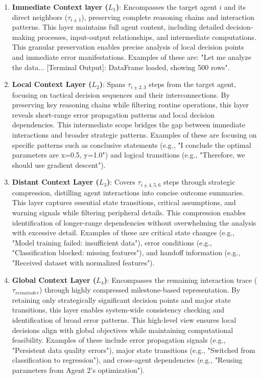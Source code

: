 \documentclass{article}
\begin{document}
\begin{enumerate}
    \item \textbf{Immediate Context layer ($L_1$)}: Encompasses the target agent $i$ and its direct neighbors ($\tau_{i\pm1}$), preserving complete reasoning chains and interaction patterns. This layer maintains full agent content, including detailed decision-making processes, input-output relationships, and intermediate computations. This granular preservation enables precise analysis of local decision points and immediate error manifestations. Examples of these are: "Let me analyze the data... [Terminal Output]: DataFrame loaded, showing 500 rows". 
    \item \textbf{Local Context Layer ($L_2$)}: Spans $\tau_{i\pm2,3}$ steps from the target agent, focusing on tactical decision sequences and their interconnections. By preserving key reasoning chains while filtering routine operations, this layer reveals short-range error propagation patterns and local decision dependencies. This intermediate scope bridges the gap between immediate interactions and broader strategic patterns. Examples of these are focusing on specific patterns such as conclusive statements (e.g., "I conclude the optimal parameters are x=0.5, y=1.0") and logical transitions (e.g., "Therefore, we should use gradient descent"). 
    \item \textbf{Distant Context Layer ($L_3$)}: Covers $\tau_{i\pm4,5,6}$ steps through strategic compression, distilling agent interactions into concise outcome summaries. This layer captures essential state transitions, critical assumptions, and warning signals while filtering peripheral details. This compression enables identification of longer-range dependencies without overwhelming the analysis with excessive detail. Examples of these are critical state changes (e.g., "Model training failed: insufficient data"), error conditions (e.g., "Classification blocked: missing features"), and handoff information (e.g., "Received dataset with normalized features"). 
    \item \textbf{Global Context Layer ($L_4$)}: Encompasses the remaining interaction trace ($\tau_{remainder}$) through highly compressed milestone-based representation. By retaining only strategically significant decision points and major state transitions, this layer enables system-wide consistency checking and identification of broad error patterns. This high-level view ensures local decisions align with global objectives while maintaining computational feasibility. Examples of these include error propagation signals (e.g., "Persistent data quality errors"), major state transitions (e.g., "Switched from classification to regression"), and cross-agent dependencies (e.g., "Reusing parameters from Agent 2's optimization"). 
\end{enumerate}
\end{document}
